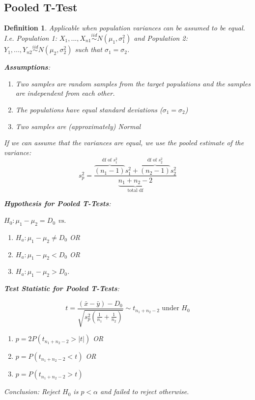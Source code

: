 \documentclass[a4paper,11pt]{article}
\newtheorem{defn}[thm]{Definition}
\begin{document}
\subsection{Pooled T-Test}
\begin{defn}
\normalfont
Applicable when population variances can be assumed to be equal. I.e. Population 1: $X_1,...,X_{n1}\stackrel{iid}{\sim}N(\mu_1, \sigma_1^2)$ and Population 2: $Y_1,...,Y_{n2}\stackrel{iid}{\sim}N(\mu_2,\sigma_2^2)$ such that $\sigma_1=\sigma_2$. 

\textbf{Assumptions}:
\begin{enumerate}
\item Two samples are random samples from the target populations and the samples are independent from each other. 
\item The populations have equal standard deviations ($\sigma_1=\sigma_2$)
\item Two samples are (approximately) Normal
\end{enumerate}
If we can assume that the variances are equal, we use the {pooled estimate of the variance}: 
$$s_p^2=\frac{\overbrace{(n_1-1)}^\text{df of $s_1^2$}s_1^2+\overbrace{(n_2-1)}^\text{df of $s_2^2$}s_2^2}{\underbrace{n_1+n_2-2}_\text{total df}}$$

\textbf{Hypothesis for Pooled T-Tests}: 

$H_0:\mu_1-\mu_2=D_0$ vs. 
\begin{enumerate}
\item $H_a:\mu_1-\mu_2\neq D_0$ OR
\item $H_a:\mu_1-\mu_2<D_0$ OR
\item $H_a:\mu_1-\mu_2>D_0$. 
\end{enumerate}

\textbf{Test Statistic for Pooled T-Tests}:

$$t=\frac{(\bar{x}-\bar{y})-D_0}{\sqrt{s_p^2(\frac{1}{n_1}+\frac{1}{n_2})}}\sim t_{n_1+n_2-2}\text{ under }H_0$$

\begin{enumerate}
\item $p=2P(t_{n_1+n_2-2}>|t|)$ OR
\item $p=P(t_{n_1+n_2-2}<t)$ OR
\item $p=P(t_{n_1+n_2-2}>t)$
\end{enumerate}

Conclusion: Reject $H_0$ is $p<\alpha$ and failed to reject otherwise. 
\end{defn}
\end{document}
